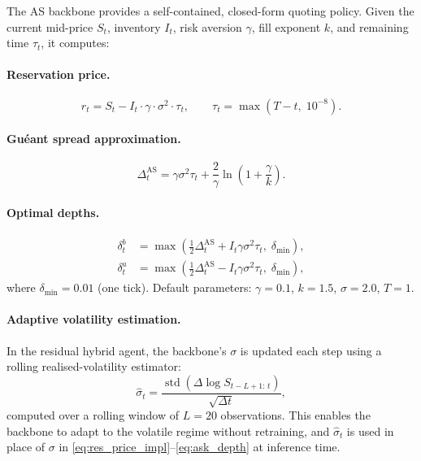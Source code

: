 \documentclass[11pt]{article}
\begin{document}
The AS backbone provides a self-contained, closed-form quoting policy.
Given the current mid-price $S_t$, inventory $I_t$, risk aversion
$\gamma$, fill exponent $k$, and remaining time $\tau_t$, it computes:

\paragraph{Reservation price.}
\begin{equation}
  r_t = S_t - I_t \cdot \gamma \cdot \sigma^2 \cdot \tau_t,
  \qquad \tau_t = \max(T - t,\; 10^{-8}).
  \label{eq:res_price_impl}
\end{equation}

\paragraph{Gu\'{e}ant spread approximation.}
\begin{equation}
  \Delta^{\text{AS}}_t = \gamma \sigma^2 \tau_t
    + \frac{2}{\gamma}\ln\!\left(1 + \frac{\gamma}{k}\right).
  \label{eq:gueant_spread}
\end{equation}

\paragraph{Optimal depths.}
\begin{align}
  \delta^b_t &= \max\!\left(\tfrac{1}{2}\Delta^{\text{AS}}_t
    + I_t \gamma \sigma^2 \tau_t,\; \delta_{\min}\right),
  \label{eq:bid_depth} \\
  \delta^a_t &= \max\!\left(\tfrac{1}{2}\Delta^{\text{AS}}_t
    - I_t \gamma \sigma^2 \tau_t,\; \delta_{\min}\right),
  \label{eq:ask_depth}
\end{align}
where $\delta_{\min} = 0.01$ (one tick).
Default parameters: $\gamma = 0.1$, $k = 1.5$, $\sigma = 2.0$, $T = 1$.

\paragraph{Adaptive volatility estimation.}
In the residual hybrid agent, the backbone's $\sigma$ is updated each step
using a rolling realised-volatility estimator:
\begin{equation}
  \hat{\sigma}_t =
    \frac{\operatorname{std}\!\left(\Delta\log S_{t-L+1:\,t}\right)}
         {\sqrt{\Delta t}},
  \label{eq:realvol}
\end{equation}
computed over a rolling window of $L = 20$ observations.
This enables the backbone to adapt to the volatile regime without
retraining, and $\hat\sigma_t$ is used in place of $\sigma$ in
\eqref{eq:res_price_impl}--\eqref{eq:ask_depth} at inference time.
\end{document}
